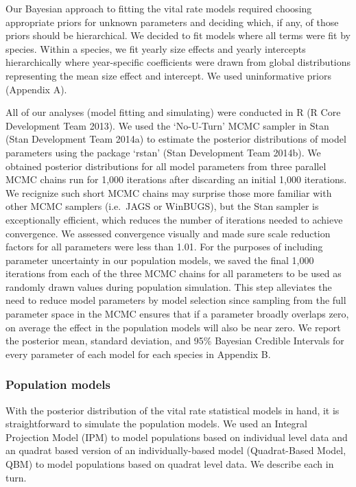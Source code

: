 \documentclass[12pt,]{article}
\begin{document}
Our Bayesian approach to fitting the vital rate models required choosing
appropriate priors for unknown parameters and deciding which, if any, of
those priors should be hierarchical. We decided to fit models where all
terms were fit by species. Within a species, we fit yearly size effects
and yearly intercepts hierarchically where year-specific coefficients
were drawn from global distributions representing the mean size effect
and intercept. We used uninformative priors (Appendix A).

All of our analyses (model fitting and simulating) were conducted in R
(R Core Development Team 2013). We used the `No-U-Turn' MCMC sampler in
Stan (Stan Development Team 2014a) to estimate the posterior
distributions of model parameters using the package `rstan' (Stan
Development Team 2014b). We obtained posterior distributions for all
model parameters from three parallel MCMC chains run for 1,000
iterations after discarding an initial 1,000 iterations. We recignize
such short MCMC chains may surprise those more familiar with other MCMC
samplers (i.e.~JAGS or WinBUGS), but the Stan sampler is exceptionally
efficient, which reduces the number of iterations needed to achieve
convergence. We assessed convergence visually and made sure scale
reduction factors for all parameters were less than 1.01. For the
purposes of including parameter uncertainty in our population models, we
saved the final 1,000 iterations from each of the three MCMC chains for
all parameters to be used as randomly drawn values during population
simulation. This step alleviates the need to reduce model parameters by
model selection since sampling from the full parameter space in the MCMC
ensures that if a parameter broadly overlaps zero, on average the effect
in the population models will also be near zero. We report the posterior
mean, standard deviation, and 95\% Bayesian Credible Intervals for every
parameter of each model for each species in Appendix B.

\subsubsection{Population models}\label{population-models}

With the posterior distribution of the vital rate statistical models in
hand, it is straightforward to simulate the population models. We used
an Integral Projection Model (IPM) to model populations based on
individual level data and an quadrat based version of an
individually-based model (Quadrat-Based Model, QBM) to model populations
based on quadrat level data. We describe each in turn.
\end{document}

